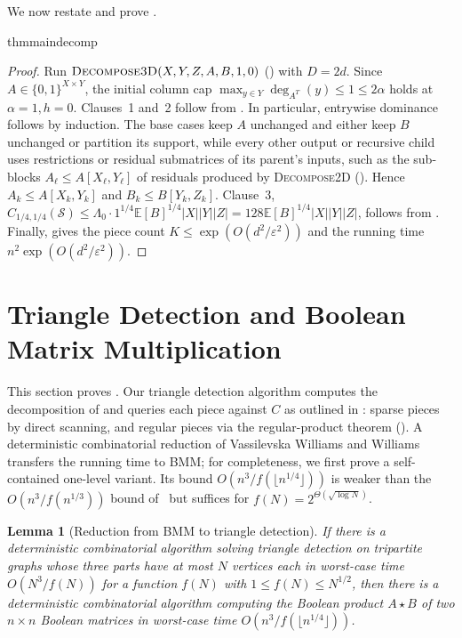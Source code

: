 \documentclass[11pt]{article}
\newtheorem{lemma}[theorem]{Lemma}
\newcommand{\innercustomthm}{}
\theoremstyle{definition}
\renewcommand{\label}[1]{}%
\newcommand{\restatethm}[2]{%
  \begingroup
  \renewcommand{\innercustomthm}{\ref{#2}}%
  \csname #1\endcsname
  \endgroup
}
\newcommand{\E}{\mathbb{E}}
\newcommand{\abs}[1]{\left\lvert #1 \right\rvert}
\newcommand{\dens}[1]{\E[#1]}
\newcommand{\pot}{C_{1/4,1/4}}
\newcommand{\DecomposeTwoD}{\textnormal{\textsc{Decompose2D}}}
\newcommand{\DecomposeThreeD}{\textnormal{\textsc{Decompose3D}}}
\begin{document}
We now restate and prove .

\restatethm{thmmaindecomp}{thm:main-decomp}

\begin{proof}
Run $\DecomposeThreeD(X, Y, Z, A, B, 1, 0)$ () with $D = 2d$. Since $A \in \{0, 1\}^{X \times Y}$, the initial column cap $\max_{y \in Y}\deg_{A^T}(y) \le 1 \le 2\alpha$ holds at $\alpha = 1, h = 0$. Clauses~1 and~2 follow from . In particular, entrywise dominance follows by induction. The base cases keep $A$ unchanged and either keep $B$ unchanged or partition its support, while every other output or recursive child uses restrictions or residual submatrices of its parent's inputs, such as the sub-blocks $A_\ell \le A[X_\ell, Y_\ell]$ of residuals produced by \DecomposeTwoD{} (). Hence $A_k \le A[X_k, Y_k]$ and $B_k \le B[Y_k, Z_k]$. Clause~3, $\pot(\mathcal{S}) \le \Lambda_0 \cdot 1^{1/4}\dens{B}^{1/4}\abs{X}\abs{Y}\abs{Z} = 128\dens{B}^{1/4}\abs{X}\abs{Y}\abs{Z}$, follows from . Finally,  gives the piece count $K \le \exp(O(d^2/\varepsilon^2))$ and the running time $n^2 \exp(O(d^2/\varepsilon^2))$.
\end{proof}

\section{Triangle Detection and Boolean Matrix Multiplication}
\label{sec:bmm}

This section proves . Our triangle detection algorithm computes the decomposition of  and queries each piece against $C$ as outlined in : sparse pieces by direct scanning, and regular pieces via the regular-product theorem (). A deterministic combinatorial reduction of Vassilevska Williams and Williams~\cite{WilliamsW18} transfers the running time to BMM; for completeness, we first prove a self-contained one-level variant. Its bound $O(n^3 / f(\lfloor n^{1/4} \rfloor))$ is weaker than the $O(n^3 / f(n^{1/3}))$ bound of~\cite[Lemma~6.1]{AFKLM24} but suffices for $f(N) = 2^{\Theta(\sqrt{\log N})}$.

\begin{lemma}[Reduction from BMM to triangle detection]
\label{lem:bmm-to-tridet}
If there is a deterministic combinatorial algorithm solving triangle detection on tripartite graphs whose three parts have at most $N$ vertices each in worst-case time $O(N^3 / f(N))$ for a function $f(N)$ with $1 \le f(N) \le N^{1/2}$, then there is a deterministic combinatorial algorithm computing the Boolean product $A \star B$ of two $n \times n$ Boolean matrices in worst-case time $O\!\left(n^3 / f(\lfloor n^{1/4} \rfloor)\right)$.
\end{lemma}
\end{document}
